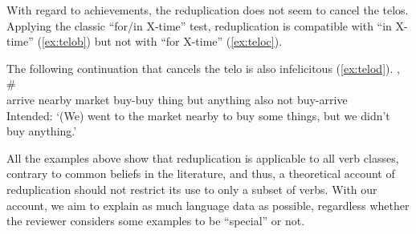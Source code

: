 \documentclass[fleqn,twoside]{article}
\begin{document}
\begin{enumerate}
With regard to achievements, the reduplication does not seem to cancel the telos.
Applying the classic ``for/in X-time'' test, reduplication is compatible with ``in X-time'' (\ref{ex:telob}) but not with ``for X-time'' (\ref{ex:teloc}).
\ea
{}


\z\z
The following continuation that cancels the telo is also infelicitous (\ref{ex:telod}).
\ea\label{ex:telod} %
\gll {}    , \#     \\
arrive nearby market buy-buy thing {} but anything also not buy-arrive\\
\glt Intended: `(We) went to the market nearby to buy some things, but we didn't buy anything.'
\z

All the examples above show that reduplication is applicable to all verb classes, contrary to common beliefs in the literature,
and thus, a theoretical account of reduplication should not restrict its use to only a subset of verbs.
With our account, we aim to explain as much language data as possible, regardless whether the reviewer considers some examples to be ``special'' or not.


\end{enumerate}
\end{document}
